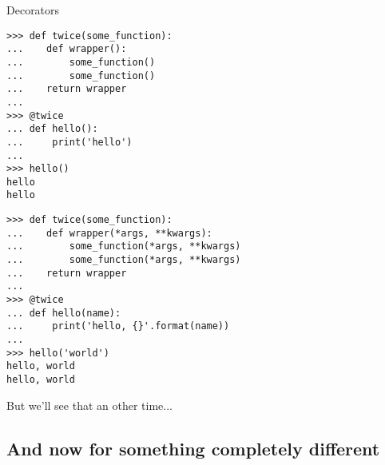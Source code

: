 \documentclass[ignorenonframetext,]{beamer}
\begin{document}
\begin{frame}[fragile]{Decorators}
    \begin{overprint}
    \begin{tcolorbox}
        \begin{verbatim}
>>> def twice(some_function):
...    def wrapper():
...        some_function()
...        some_function()
...    return wrapper
...
>>> @twice
... def hello():
...     print('hello')
...
>>> hello()
hello
hello
        \end{verbatim}
    \end{tcolorbox}

    \begin{tcolorbox}
        \begin{verbatim}
>>> def twice(some_function):
...    def wrapper(*args, **kwargs):
...        some_function(*args, **kwargs)
...        some_function(*args, **kwargs)
...    return wrapper
...
>>> @twice
... def hello(name):
...     print('hello, {}'.format(name))
...
>>> hello('world')
hello, world
hello, world
        \end{verbatim}
    \end{tcolorbox}

    But we'll see that an other time...

    \end{overprint}
\end{frame}

\subsection{And now for something completely different}
\end{document}
